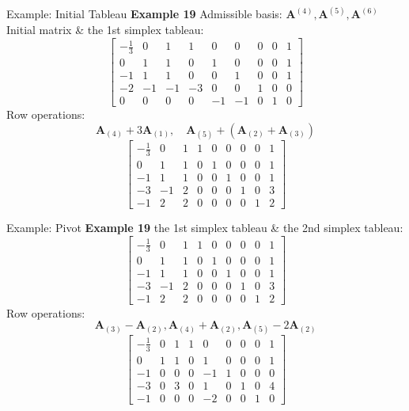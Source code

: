 \documentclass[aspectratio=169,hyperref,UTF8,CJK]{beamer}
\begin{document}
\begin{frame}{Example: Initial Tableau}
\textbf{Example 19}
Admissible basis: \(\mathbf{A}^{(4)}, \mathbf{A}^{(5)}, \mathbf{A}^{(6)}\) \\
Initial matrix \& the 1st simplex tableau:
\[
\begin{bmatrix}
-\frac{1}{3} & 0 & 1 & 1 & 0 & 0 & 0 & 0 & 1 \\
0 & 1 & 1 & 0 & 1 & 0 & 0 & 0 & 1 \\
-1 & 1 & 1 & 0 & 0 & 1 & 0 & 0 & 1 \\
-2 & -1 & -1 & -3 & 0 & 0 & 1 & 0 & 0 \\
0 & 0 & 0 & 0 & -1 & -1 & 0 & 1 & 0
\end{bmatrix}
\]
Row operations:
\[
\mathbf{A}_{(4)} + 3\mathbf{A}_{(1)}, \quad \mathbf{A}_{(5)} + (\mathbf{A}_{(2)} + \mathbf{A}_{(3)})
\]
\[
\begin{bmatrix}
-\frac{1}{3} & 0 & 1 & 1 & 0 & 0 & 0 & 0 & 1 \\
0 & 1 & 1 & 0 & 1 & 0 & 0 & 0 & 1 \\
-1 & 1 & 1 & 0 & 0 & 1 & 0 & 0 & 1 \\
-3 & -1 & 2 & 0 & 0 & 0 & 1 & 0 & 3 \\
-1 & 2 & 2 & 0 & 0 & 0 & 0 & 1 & 2
\end{bmatrix}
\]
\end{frame}

\begin{frame}{Example: Pivot}
\textbf{Example 19}
the 1st simplex tableau \& the 2nd simplex tableau:
\[
\begin{bmatrix}
-\frac{1}{3} & 0 & 1 & 1 & 0 & 0 & 0 & 0 & 1 \\
0 & 1 & 1 & 0 & 1 & 0 & 0 & 0 & 1 \\
-1 & 1 & 1 & 0 & 0 & 1 & 0 & 0 & 1 \\
-3 & -1 & 2 & 0 & 0 & 0 & 1 & 0 & 3 \\
-1 & 2 & 2 & 0 & 0 & 0 & 0 & 1 & 2
\end{bmatrix}
\]
Row operations:
\[
\mathbf{A}_{(3)} - \mathbf{A}_{(2)}, \mathbf{A}_{(4)} + \mathbf{A}_{(2)}, \mathbf{A}_{(5)} - 2\mathbf{A}_{(2)}
\]
\[
\begin{bmatrix}
-\frac{1}{3} & 0 & 1 & 1 & 0 & 0 & 0 & 0 & 1 \\
0 & 1 & 1 & 0 & 1 & 0 & 0 & 0 & 1 \\
-1 & 0 & 0 & 0 & -1 & 1 & 0 & 0 & 0 \\
-3 & 0 & 3 & 0 & 1 & 0 & 1 & 0 & 4 \\
-1 & 0 & 0 & 0 & -2 & 0 & 0 & 1 & 0
\end{bmatrix}
\]
\end{frame}
\end{document}
